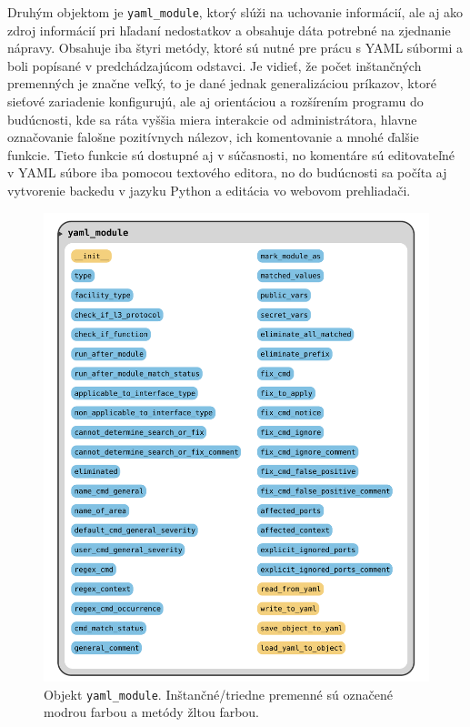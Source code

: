 Druhým objektom je \texttt{yaml\_module}, ktorý slúži na uchovanie informácií, ale aj ako zdroj informácií pri hľadaní nedostatkov a obsahuje dáta potrebné na zjednanie nápravy. Obsahuje iba štyri metódy, ktoré sú nutné pre prácu s YAML súbormi a boli popísané v predchádzajúcom odstavci. Je vidieť, že počet inštančných premenných je značne veľký, to je dané jednak generalizáciou príkazov, ktoré sieťové zariadenie konfigurujú, ale aj orientáciou a rozšírením programu do budúcnosti, kde sa ráta vyššia miera interakcie od administrátora, hlavne označovanie falošne pozitívnych nálezov, ich komentovanie a mnohé ďalšie funkcie. Tieto funkcie sú dostupné aj v súčasnosti, no komentáre sú editovateľné v YAML súbore iba pomocou textového editora, no do budúcnosti sa počíta aj vytvorenie backedu v jazyku Python a editácia vo webovom prehliadači. 
\begin{figure}[H]
	\begin{center}
		\includegraphics[scale=0.45]{obrazky/yaml_module_class.pdf}
	\end{center}
	\caption[Objekt \texttt{yaml\_module}. Inštančné/triedne premenné sú označené modrou farbou a metódy žltou farbou.]{Objekt \texttt{yaml\_module}. Inštančné/triedne premenné sú označené modrou farbou a metódy žltou farbou.}
	\label{module_class}
\end{figure}


